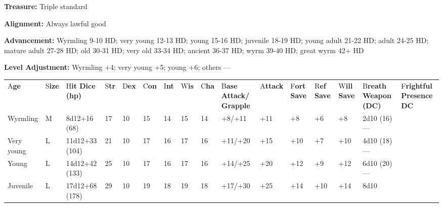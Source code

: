 \documentclass{article}
\begin{document}
{\textbf{Treasure:} Triple standard

\textbf{Alignment: }Always lawful good

\textbf{Advancement: }Wyrmling 9-10 HD; very young 12-13 HD; young 15-16 HD; juvenile 
18-19 HD; young adult 21-22 HD; adult 24-25 HD; mature adult 27-28 HD; old 30-31 
HD; very old 33-34 HD; ancient 36-37 HD; wyrm 39-40 HD; great wyrm 42+ HD

\textbf{Level Adjustment:} Wyrmling +4; very young +5; young +6; others ---

\vspace{12pt}
\begin{tabular}{|>{\raggedright}p{18pt}|>{\raggedright}p{6pt}|>{\raggedright}p{18pt}|>{\raggedright}p{4pt}|>{\raggedright}p{5pt}|>{\raggedright}p{6pt}|>{\raggedright}p{4pt}|>{\raggedright}p{5pt}|>{\raggedright}p{6pt}|>{\raggedright}p{14pt}|>{\raggedright}p{10pt}|>{\raggedright}p{8pt}|>{\raggedright}p{8pt}|>{\raggedright}p{8pt}|>{\raggedright}p{16pt}|>{\raggedright}p{17pt}|}
\hline
\multicolumn{16}{|p{158pt}|}{G\textbf{old Dragons by Age}}\tabularnewline
\hline
A{\small{}\textbf{ge}} & S{\small{}\textbf{ize}} & H{\small{}\textbf{it Dice (hp)}} & S{\small{}\textbf{tr}} & D{\small{}\textbf{ex}} & C{\small{}\textbf{on}} & I{\small{}\textbf{nt}} & W{\small{}\textbf{is}} & C{\small{}\textbf{ha}} & B{\small{}\textbf{ase 
Attack/}}\linebreak{}
{\small{}\textbf{Grapple}} & A{\small{}\textbf{ttack}} & F{\small{}\textbf{ort 
Save}} & R{\small{}\textbf{ef Save}} & W{\small{}\textbf{ill Save}} & B{\small{}\textbf{reath 
Weapon (DC)}} & F{\small{}\textbf{rightful Presence DC}}\tabularnewline
\hline
W{\small{}yrmling} & M & 8{\small{}d12+16 (68)} & 1{\small{}7} & 1{\small{}0} & 1{\small{}5} & 1{\small{}4} & 1{\small{}5} & 1{\small{}4} & +{\small{}8/+11} & +{\small{}11} & +{\small{}8} & +{\small{}6} & +{\small{}8} & 2{\small{}d10 
(16)}--- & \tabularnewline
\hline
V{\small{}ery young} & L & 1{\small{}1d12+33 (104)} & 2{\small{}1} & 1{\small{}0} & 1{\small{}7} & 1{\small{}6} & 1{\small{}7} & 1{\small{}6} & +{\small{}11/+20} & +{\small{}15} & +{\small{}10} & +{\small{}7} & +{\small{}10} & 4{\small{}d10 
(18)}--- & \tabularnewline
\hline
Y{\small{}oung} & L & 1{\small{}4d12+42 (133)} & 2{\small{}5} & 1{\small{}0} & 1{\small{}7} & 1{\small{}6} & 1{\small{}7} & 1{\small{}6} & +{\small{}14/+25} & +{\small{}20} & +{\small{}12} & +{\small{}9} & +{\small{}12} & 6{\small{}d10 
(20)}--- & \tabularnewline
\hline
J{\small{}uvenile} & L & 1{\small{}7d12+68 (178)} & 2{\small{}9} & 1{\small{}0} & 1{\small{}9} & 1{\small{}8} & 1{\small{}9} & 1{\small{}8} & +{\small{}17/+30} & +{\small{}25} & +{\small{}14} & +{\small{}10} & +{\small{}14} & 8{\small{}d10 
}
\end{tabular}}
\end{document}
